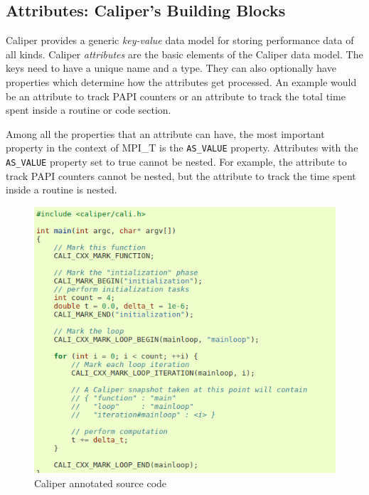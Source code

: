 \subsection{Attributes: Caliper's Building Blocks}
Caliper provides a generic \textit{key-value} data model for storing performance data of all kinds. Caliper \textit{attributes} are the basic elements of the Caliper data model. The keys need to have a unique name and a type. They can also optionally have properties which determine how the attributes get processed. An example would be an attribute to track PAPI counters or an attribute to track the total time spent inside a routine or code section. 
\par Among all the properties that an attribute can have, the most important property in the context of MPI\_T is the \verb+AS_VALUE+ property. Attributes with the \verb+AS_VALUE+ property set to true cannot be nested. For example, the attribute to track PAPI counters cannot be nested, but the attribute to track the time spent inside a routine is nested.
\begin{center}
	\begin{figure}[tbp!]
         \centering
  \captionsetup{justification=centering}
		\includegraphics[scale=0.3, width=\columnwidth, keepaspectratio]{figures/cali-example}
		\caption{Caliper annotated source code}
		\label{fig:caliexample}
	\end{figure}
\end{center}

